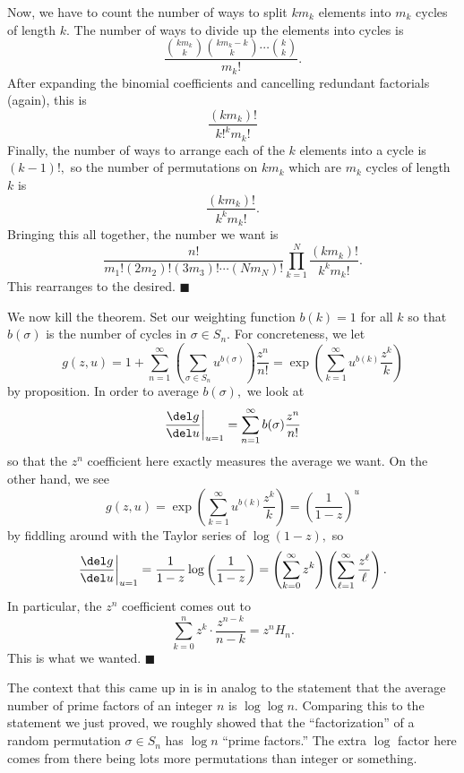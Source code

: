 Now, we have to count the number of ways to split $km_k$ elements into $m_k$ cycles of length $k.$ The number of ways to divide up the elements into cycles is
\[\frac{\displaystyle\binom{km_k}k\binom{km_k-k}k\cdots\binom kk}{m_k!}.\]
After expanding the binomial coefficients and cancelling redundant factorials (again), this is
\[\frac{(km_k)!}{k!^km_k!}\]
Finally, the number of ways to arrange each of the $k$ elements into a cycle is $(k-1)!,$ so the number of permutations on $km_k$ which are $m_k$ cycles of length $k$ is
\[\frac{(km_k)!}{k^km_k!}.\]
Bringing this all together, the number we want is
\[\frac{n!}{m_1!(2m_2)!(3m_3)!\cdots(Nm_N)!}\prod_{k=1}^N\frac{(km_k)!}{k^km_k!}.\]
This rearranges to the desired. $\blacksquare$

We now kill the theorem. Set our weighting function $b(k)=1$ for all $k$ so that $b(\sigma)$ is the number of cycles in $\sigma\in S_n.$ For concreteness, we let
\[g(z,u)=1+\sum_{n=1}^\infty\left(\sum_{\sigma\in S_n}u^{b(\sigma)}\right)\frac{z^n}{n!}=\exp\left(\sum_{k=1}^\infty u^{b(k)}\frac{z^k}k\right)\]
by proposition. In order to average $b(\sigma),$ we look at
\[\frac{\del g}{\del u}\bigg|_{u=1}=\sum_{n=1}^\infty b(\sigma)\frac{z^n}{n!}\]
so that the $z^n$ coefficient here exactly measures the average we want. On the other hand, we see
\[g(z,u)=\exp\left(\sum_{k=1}^\infty u^{b(k)}\frac{z^k}k\right)=\left(\frac1{1-z}\right)^u\]
by fiddling around with the Taylor series of $\log(1-z),$ so
\[\frac{\del g}{\del u}\bigg|_{u=1}=\frac1{1-z}\log\left(\frac1{1-z}\right)=\left(\sum_{k=0}^\infty z^k\right)\left(\sum_{\ell=1}^\infty\frac{z^\ell}\ell\right).\]
In particular, the $z^n$ coefficient comes out to
\[\sum_{k=0}^nz^k\cdot\frac{z^{n-k}}{n-k}=z^nH_n.\]
This is what we wanted. $\blacksquare$

The context that this came up in is in analog to the statement that the average number of prime factors of an integer $n$ is $\log\log n.$ Comparing this to the statement we just proved, we roughly showed that the ``factorization'' of a random permutation $\sigma\in S_n$ has $\log n$ ``prime factors.'' The extra $\log$ factor here comes from there being lots more permutations than integer or something.

